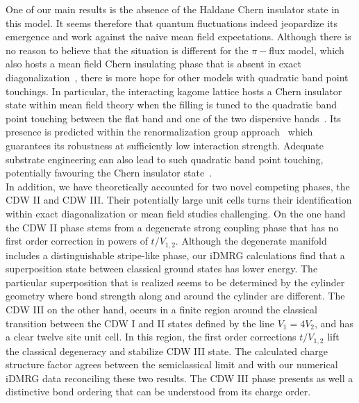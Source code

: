\documentclass[aps,prx,10pt,twocolumn,floatfix,superscriptaddress,showpacs,numerical,footinbib]{revtex4-1}
\begin{document}
One of our main results is the absence of the Haldane Chern insulator state in this model.
%
It seems therefore that quantum fluctuations indeed jeopardize its emergence and work against
the naive mean field expectations.
%
Although there is no reason to believe that the situation is different for the $\pi-$flux model, which also hosts a
mean field Chern insulating phase that is absent in exact diagonalization~\cite{WF10,JGC13}, 
there is more hope for other models with quadratic band point touchings.
%
In particular, the interacting kagome lattice hosts a Chern insulator state within mean field theory when the filling is tuned to
the quadratic band point touching between the flat band and one of the two dispersive bands~\cite{WRW10}.
%
Its presence is predicted within the renormalization group approach~\cite{SF08,SYF09} which guarantees
its robustness at sufficiently low interaction strength.
%
Adequate substrate engineering can also lead to such quadratic band point touching, potentially favouring the Chern insulator state~\cite{MVB14}.
\\
%
In addition, we have theoretically accounted for two novel competing phases, the CDW II and CDW III.
%
Their potentially large unit cells turns their identification within exact diagonalization or mean field studies 
challenging.
%
On the one hand the CDW II phase stems from a degenerate strong coupling phase that has no first order correction in powers of $t/V_{1,2}$.
%
Although the degenerate manifold includes a distinguishable stripe-like phase, our iDMRG calculations find that a superposition state 
between classical ground states has lower energy.
%
The particular superposition that is realized seems to be determined by the cylinder geometry where bond strength along
and around the cylinder are different. 
%
The CDW III on the other hand, occurs in a finite region around the classical transition between
the CDW I and II states defined by the line $V_{1}=4V_{2}$, and has a clear twelve site unit cell.
%
In this region, the first order corrections $t/V_{1,2}$ lift the classical degeneracy and stabilize CDW III state.
%
The calculated charge structure factor agrees between the semiclassical limit and with our numerical iDMRG data 
reconciling these two results.
%
The CDW III phase presents as well a distinctive bond ordering that can be understood from its charge order.
\end{document}
